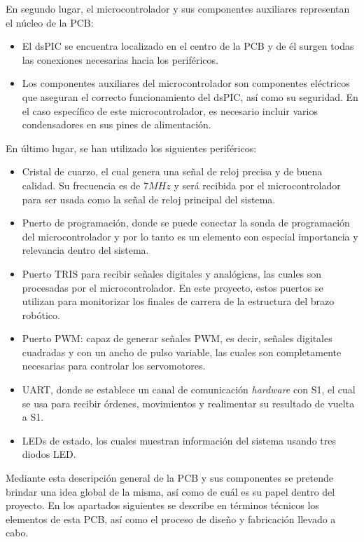En segundo lugar, el microcontrolador y sus componentes auxiliares representan el núcleo de la \ac{PCB}:
\begin{itemize}
    \item El dsPIC se encuentra localizado en el centro de la \ac{PCB} y de él surgen todas las conexiones necesarias hacia los periféricos.
    \item Los componentes auxiliares del microcontrolador son componentes eléctricos que aseguran el correcto funcionamiento del dsPIC, así como su seguridad. En el caso específico de este microcontrolador, es necesario incluir varios condensadores en sus pines de alimentación.
\end{itemize}

En último lugar, se han utilizado los siguientes periféricos:

\begin{itemize}
    \item Cristal de cuarzo, el cual genera una señal de reloj precisa y de buena calidad. Su frecuencia es de $7MHz$ y será recibida por el microcontrolador para ser usada como la señal de reloj principal del sistema.
    
    \item Puerto de programación, donde se puede conectar la sonda de programación del microcontrolador y por lo tanto es un elemento con especial importancia y relevancia dentro del sistema.
    
    \item Puerto TRIS para recibir señales digitales y analógicas, las cuales son procesadas por el microcontrolador. En este proyecto, estos puertos se utilizan para monitorizar los finales de carrera de la estructura del brazo robótico.
    \item Puerto PWM: capaz de generar señales PWM, es decir, señales digitales cuadradas y con un ancho de pulso variable, las cuales son completamente necesarias para controlar los servomotores.
    
    \item UART, donde se establece un canal de comunicación \textit{hardware} con S1, el cual se usa para recibir órdenes, movimientos y realimentar su resultado de vuelta a S1.
    
    \item LEDs de estado, los cuales muestran información del sistema usando tres diodos LED.
\end{itemize}

Mediante esta descripción general de la \ac{PCB} y sus componentes se pretende brindar una idea global de la misma, así como de cuál es su papel dentro del proyecto. En los apartados siguientes se describe en términos técnicos los elementos de esta \ac{PCB}, así como el proceso de diseño y fabricación llevado a cabo.

